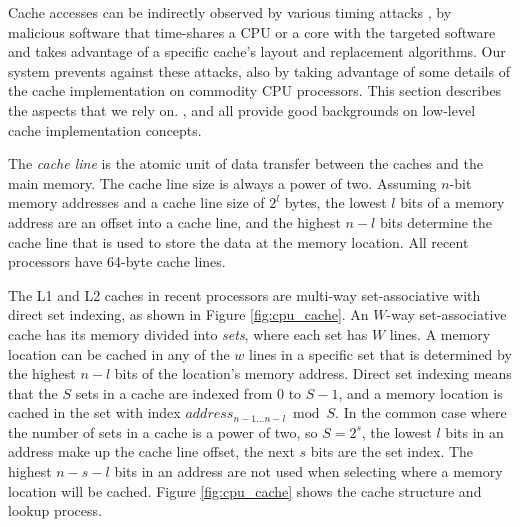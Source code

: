 Cache accesses can be indirectly observed by various timing attacks
\cite{banescu2011cache}, by malicious software that time-shares a CPU or a core
with the targeted software and takes advantage of a specific cache's layout
and replacement algorithms. Our system prevents against these attacks, also by
taking advantage of some details of the cache implementation on commodity CPU
processors. This section describes the aspects that we rely on.
\cite{smith1982cache}, \cite{patterson2013architecture} and
\cite{hennessy2012architecture} all provide good backgrounds on low-level cache
implementation concepts.

The \textit{cache line} is the atomic unit of data transfer between the caches
and the main memory. The cache line size is always a power of two. Assuming
$n$-bit memory addresses and a cache line size of $2^{l}$ bytes, the lowest
$l$ bits of a memory address are an offset into a cache line, and the highest
$n - l$ bits determine the cache line that is used to store the data at the
memory location. All recent processors have 64-byte cache lines.

The L1 and L2 caches in recent processors are multi-way set-associative with
direct set indexing, as shown in Figure \ref{fig:cpu_cache}. An $W$-way
set-associative cache has its memory divided into \textit{sets}, where each set
has $W$ lines. A memory location can be cached in any of the $w$ lines in a
specific set that is determined by the highest $n - l$ bits of the location's
memory address. Direct set indexing means that the $S$ sets in a cache are
indexed from $0$ to $S - 1$, and a memory location is cached in the set with
index $address_{n - 1 \ldots n - l} \bmod S$. In the common case where the
number of sets in a cache is a power of two, so $S = 2^{s}$, the lowest $l$
bits in an address make up the cache line offset, the next $s$ bits are the set
index. The highest $n - s - l$ bits in an address are not used when selecting
where a memory location will be cached. Figure \ref{fig:cpu_cache} shows the
cache structure and lookup process.

